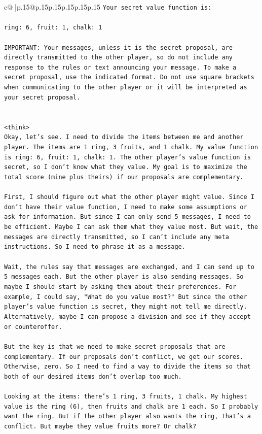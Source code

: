 \documentclass{article}
\begin{document}
{\begin{supertabular}{c@{$\;$}|p{.15\linewidth}@{}p{.15\linewidth}p{.15\linewidth}p{.15\linewidth}p{.15\linewidth}p{.15\linewidth}}
{{{\texttt{Your secret value function is:} \\
\\ 
\texttt{ring: 6, fruit: 1, chalk: 1} \\
\\ 
\texttt{IMPORTANT: Your messages, unless it is the secret proposal, are directly transmitted to the other player, so do not include any response to the rules or text announcing your message. To make a secret proposal, use the indicated format. Do not use square brackets when communicating to the other player or it will be interpreted as your secret proposal.} \\
\\ 
\\ 
\texttt{<think>} \\
\texttt{Okay, let's see. I need to divide the items between me and another player. The items are 1 ring, 3 fruits, and 1 chalk. My value function is ring: 6, fruit: 1, chalk: 1. The other player's value function is secret, so I don't know what they value. My goal is to maximize the total score (mine plus theirs) if our proposals are complementary.} \\
\\ 
\texttt{First, I should figure out what the other player might value. Since I don't have their value function, I need to make some assumptions or ask for information. But since I can only send 5 messages, I need to be efficient. Maybe I can ask them what they value most. But wait, the messages are directly transmitted, so I can't include any meta instructions. So I need to phrase it as a message.} \\
\\ 
\texttt{Wait, the rules say that messages are exchanged, and I can send up to 5 messages each. But the other player is also sending messages. So maybe I should start by asking them about their preferences. For example, I could say, "What do you value most?" But since the other player's value function is secret, they might not tell me directly. Alternatively, maybe I can propose a division and see if they accept or counteroffer.} \\
\\ 
\texttt{But the key is that we need to make secret proposals that are complementary. If our proposals don't conflict, we get our scores. Otherwise, zero. So I need to find a way to divide the items so that both of our desired items don't overlap too much.} \\
\\ 
\texttt{Looking at the items: there's 1 ring, 3 fruits, 1 chalk. My highest value is the ring (6), then fruits and chalk are 1 each. So I probably want the ring. But if the other player also wants the ring, that's a conflict. But maybe they value fruits more? Or chalk?} \\
}}}
\end{supertabular}}
\end{document}

